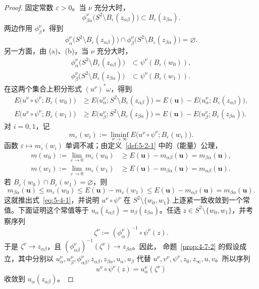 \begin{proof}
固定常数 $\varepsilon>0$。当 $\nu$ 充分大时，
\[
  \phi_{\beta\alpha}^\nu
  \bigl(S^2\setminus B_\varepsilon(z_{\alpha\beta})\bigr)
  \subset B_\varepsilon(z_{\beta\alpha}).
\]
两边作用 $\phi_\beta^\nu$，得到
\[
  \phi_\alpha^\nu\bigl(S^2\setminus B_\varepsilon(z_{\alpha\beta})\bigr)
  \cap
  \phi_\beta^\nu\bigl(S^2\setminus B_\varepsilon(z_{\beta\alpha})\bigr)
  =\varnothing.
\]
另一方面，由 (a)、(b)，当 $\nu$ 充分大时，
\[
  \begin{aligned}
  \phi_\alpha^\nu\bigl(S^2\setminus B_\varepsilon(z_{\alpha\beta})\bigr)
  &\subset\psi^\nu(B_\varepsilon(w_0)),\\
  \phi_\beta^\nu\bigl(S^2\setminus B_\varepsilon(z_{\beta\alpha})\bigr)
  &\subset\psi^\nu(B_\varepsilon(w_1)).
  \end{aligned}
\]
在这两个集合上积分形式 $(u^\nu)^*\omega$，得到
\[
  \begin{aligned}
  E\bigl(u^\nu\circ\psi^\nu;B_\varepsilon(w_0)\bigr)
  &\ge E\bigl(u_\alpha^\nu;S^2\setminus B_\varepsilon(z_{\alpha\beta})\bigr)
   =E(\mathbf u)-E\bigl(u_\alpha^\nu;B_\varepsilon(z_{\alpha\beta})\bigr),\\
  E\bigl(u^\nu\circ\psi^\nu;B_\varepsilon(w_1)\bigr)
  &\ge E\bigl(u_\beta^\nu;S^2\setminus B_\varepsilon(z_{\beta\alpha})\bigr)
   =E(\mathbf u)-E\bigl(u_\beta^\nu;B_\varepsilon(z_{\beta\alpha})\bigr).
  \end{aligned}
\]
对 $i=0,1$，记
\[
  m_\varepsilon(w_i)
  :=\liminf_{\nu\to\infty}
  E\bigl(u^\nu\circ\psi^\nu;B_\varepsilon(w_i)\bigr).
\]
函数 $\varepsilon\mapsto m_\varepsilon(w_i)$ 单调不减；由定义~\ref{def:5-2-1}
中的（能量）公理，
\[
  \begin{aligned}
  m(w_0):=\lim_{\varepsilon\to0}m_\varepsilon(w_0)
  &\ge E(\mathbf u)-m_{\alpha\beta}(\mathbf u)
   =m_{\beta\alpha}(\mathbf u),\\
  m(w_1):=\lim_{\varepsilon\to0}m_\varepsilon(w_1)
  &\ge E(\mathbf u)-m_{\beta\alpha}(\mathbf u)
   =m_{\alpha\beta}(\mathbf u).
  \end{aligned}
\]
若 $B_\varepsilon(w_0)\cap B_\varepsilon(w_1)=\varnothing$，则
\[
  m_{\beta\alpha}(\mathbf u)
  \le m_\varepsilon(w_0)
  \le E(\mathbf u)-m_\varepsilon(w_1)
  \le E(\mathbf u)-m_{\alpha\beta}(\mathbf u)
  =m_{\beta\alpha}(\mathbf u).
\]
这就推出式~\eqref{eq:5-4-1}，并说明 $u^\nu\circ\psi^\nu$ 在
$S^2\setminus\{w_0,w_1\}$ 上逐紧一致收敛到一个常值。下面证明这个常值等于
$u_\alpha(z_{\alpha\beta})=u_\beta(z_{\beta\alpha})$。任选
$z\in S^2\setminus\{w_0,w_1\}$，并考察序列
\[
  \zeta^\nu:=(\phi_\alpha^\nu)^{-1}\circ\psi^\nu(z).
\]
于是 $\zeta^\nu\to z_{\alpha\beta}$，且
$(\phi_{\alpha\beta}^\nu)^{-1}(\zeta^\nu)\to z_{\beta\alpha}$。因此，
命题~\ref{prop:4-7-2} 的假设成立，其中分别以
$u_\alpha^\nu,u_\beta^\nu,\phi_{\alpha\beta}^\nu,z_{\alpha\beta},
z_{\beta\alpha},u_\alpha,u_\beta$ 代替
$u^\nu,v^\nu,\psi^\nu,z_0,z_\infty,u,v$。所以序列
\[
  u^\nu\circ\psi^\nu(z)=u_\alpha^\nu(\zeta^\nu)
\]
收敛到 $u_\alpha(z_{\alpha\beta})$。


\end{proof}
